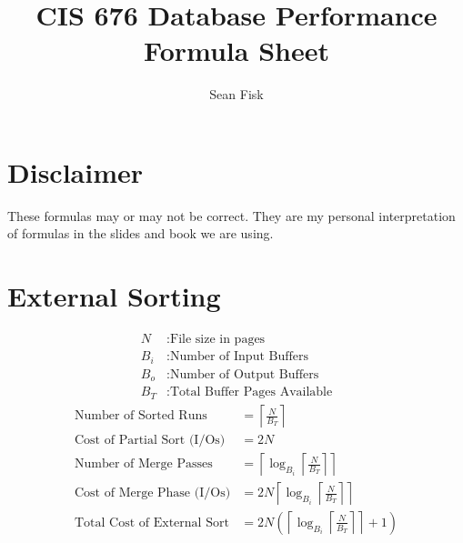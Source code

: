 \documentclass{article}
\title{CIS 676 Database Performance Formula Sheet}
\author{Sean Fisk \mailtohref{sean@seanfisk.com}}
\newcommand{\ceil}[1]{\left\lceil#1\right\rceil}
\newcommand{\paren}[1]{\left(#1\right)}
\begin{document}
\maketitle

\section*{Disclaimer}

These formulas may or may not be correct. They are my personal
interpretation of formulas in the slides and book we are using.

\section*{External Sorting}

\begin{align*}
  N &: \text{File size in pages} \\
  B_i &: \text{Number of Input Buffers} \\
  B_o &: \text{Number of Output Buffers} \\
  B_T &: \text{Total Buffer Pages Available}
\end{align*}
\begin{align*}
  \text{Number of Sorted Runs} &= \ceil{\frac{N}{B_T}}\\
  \text{Cost of Partial Sort (I/Os)} &= 2N \\
  \text{Number of Merge Passes} &= \ceil{\log_{B_i}\ceil{\frac{N}{B_T}}} \\
  \text{Cost of Merge Phase (I/Os)} &= 2N\ceil{\log_{B_i}\ceil{\frac{N}{B_T}}} \\
  \text{Total Cost of External Sort} &= 2N\paren{\ceil{\log_{B_i}\ceil{\frac{N}{B_T}}} + 1}
\end{align*}
\end{document}
